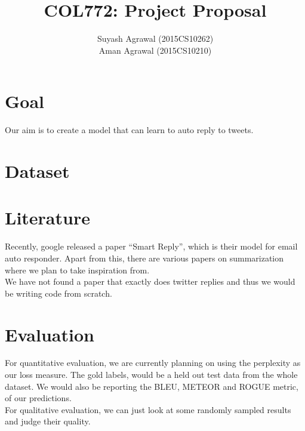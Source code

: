 \documentclass[10pt,a4paper]{article}
\title{COL772: Project Proposal}
\author{Suyash Agrawal (2015CS10262) \\ Aman Agrawal (2015CS10210)}
\begin{document}
\maketitle
\section{Goal}
    Our aim is to create a model that can learn to auto reply to tweets.
\section{Dataset}
\section{Literature}
    Recently, google released a paper ``Smart Reply''\cite{paper:smartReply}, which is their model for 
    email auto responder. Apart from this, there are various papers on summarization\cite{paper:pointer}
    where we plan to take inspiration from.\\
    We have not found a paper that exactly does twitter replies and thus we would be writing code from scratch.
\section{Evaluation}
    For quantitative evaluation, we are currently planning on using the perplexity as our loss measure. The gold
    labels, would be a held out test data from the whole dataset. We would also be reporting the BLEU, METEOR and
    ROGUE metric, of our predictions.\\
    For qualitative evaluation, we can just look at some randomly sampled results and judge their quality.

    
    
\end{document}

